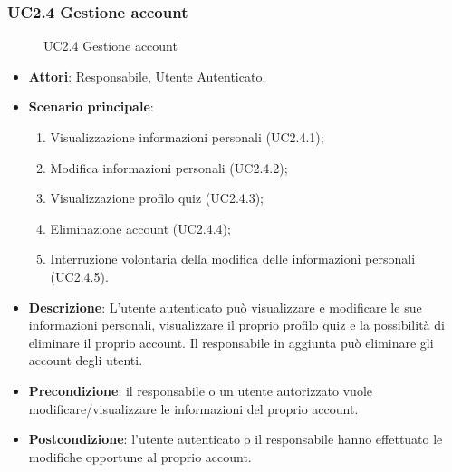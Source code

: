 \subsubsection{UC2.4 Gestione account}
\begin{figure}[H]
\centering
\noindent{}
\caption{UC2.4 Gestione account}
\end{figure}
\begin{itemize}
\item \textbf{Attori}: Responsabile, Utente Autenticato.
\item \textbf{Scenario principale}:
\begin{enumerate}
\item Visualizzazione informazioni personali (UC2.4.1);
\item Modifica informazioni personali (UC2.4.2);
\item Visualizzazione profilo quiz (UC2.4.3);
\item Eliminazione account (UC2.4.4);
\item Interruzione volontaria della modifica delle informazioni personali (UC2.4.5).
\end{enumerate}
\item \textbf{Descrizione}: L'utente autenticato può visualizzare e modificare le sue informazioni personali, visualizzare il proprio profilo quiz e la possibilità di eliminare il proprio account. Il responsabile in aggiunta può eliminare gli account degli utenti.
\item \textbf{Precondizione}: il responsabile o un utente autorizzato vuole modificare/visualizzare le informazioni del proprio account.
\item \textbf{Postcondizione}: l'utente autenticato o il responsabile hanno effettuato le modifiche opportune al proprio account.
\end{itemize}

